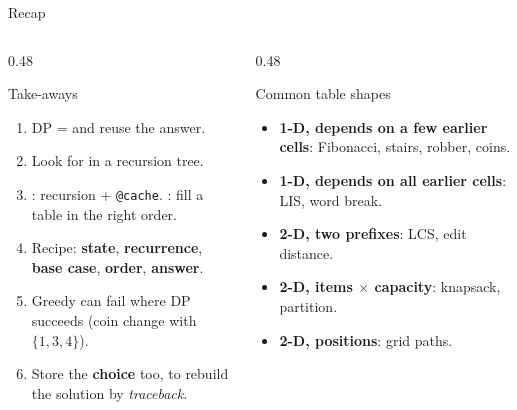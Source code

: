 \documentclass[aspectratio=169,10pt]{beamer}
\begin{document}
\begin{frame}{Recap}
\begin{columns}[T]
\begin{column}{0.48\textwidth}
\begin{block}{Take-aways}
{\small
\begin{enumerate}\setlength\itemsep{3pt}
\item DP =  and reuse the answer.
\item Look for  in a recursion tree.
\item {}: recursion + \texttt{@cache}. : fill a table in the right order.
\item Recipe: \textbf{state}, \textbf{recurrence}, \textbf{base case}, \textbf{order}, \textbf{answer}.
\item Greedy can fail where DP succeeds (coin change with $\{1,3,4\}$).
\item Store the \textbf{choice} too, to rebuild the solution by \emph{traceback}.
\end{enumerate}}
\end{block}
\end{column}
\begin{column}{0.48\textwidth}
\begin{block}{Common table shapes}
{\small
\begin{itemize}\setlength\itemsep{3pt}
\item \textbf{1-D, depends on a few earlier cells}: Fibonacci, stairs, robber, coins.
\item \textbf{1-D, depends on all earlier cells}: LIS, word break.
\item \textbf{2-D, two prefixes}: LCS, edit distance.
\item \textbf{2-D, items $\times$ capacity}: knapsack, partition.
\item \textbf{2-D, positions}: grid paths.
\end{itemize}}
\end{block}
\end{column}
\end{columns}
\end{frame}
\end{document}
